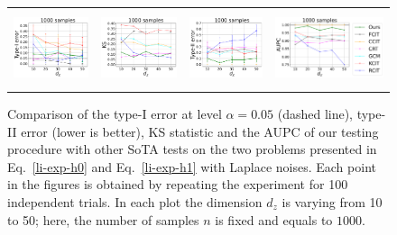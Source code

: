 \begin{figure}[h]
\begin{tabular}{cccc} 
\includegraphics[height=2.2cm]{sections/appendix/independence_testing_kernel/figures_li_highdim_lap/nsamples_fixed_1000_li_dim_10_50_typeI.pdf}& \includegraphics[height=2.2cm]{sections/appendix/independence_testing_kernel/figures_li_highdim_lap/nsamples_fixed_1000_li_dim_10_50_ks.pdf} & 
\includegraphics[height=2.2cm]{sections/appendix/independence_testing_kernel/figures_li_highdim_lap/nsamples_fixed_1000_li_dim_10_50_typeII.pdf}& \includegraphics[height=2.2cm]{sections/appendix/independence_testing_kernel/figures_li_highdim_lap/nsamples_fixed_1000_li_dim_10_50_aupc.pdf}
\end{tabular}
\caption{Comparison of the type-I error at level $\alpha=0.05$ (dashed line), type-II error (lower is better), KS statistic and the AUPC of our testing procedure with other SoTA tests on the two problems presented in Eq.~\eqref{li-exp-h0} and Eq.~\eqref{li-exp-h1} with Laplace noises. Each point in the figures is obtained by repeating the experiment for 100 independent trials. In each plot the dimension $d_z$ is varying from 10 to 50; here, the number of samples $n$ is fixed and equals to $1000$. 
\label{fig-exp-li-highdim-laplace-supp}}
\vspace{-0.8cm}
\end{figure}










